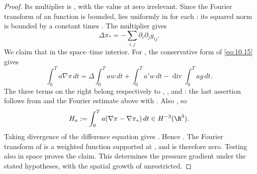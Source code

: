 \begin{proof}
%
Its multiplier is , with the value at zero
irrelevant. Since the Fourier transform of an  function is
bounded,  lies uniformly in
 for each : its squared
norm is bounded by a constant times
. The multiplier gives
\[
  \Delta\pi_*=-\sum_{i,j}\partial_i\partial_jg_{ij}.
\]
We claim that  in the space--time interior.
For , the conservative form of
\eqref{eq:10.15} gives
\[
  \int_0^T a\nabla\pi\,dt
  =\Delta\int_0^T aw\,dt+\int_0^T a'w\,dt
   -\operatorname{div}\int_0^T ag\,dt.
\]
The three terms on the right belong respectively to
, , and
: the last assertion follows from
 and the Fourier estimate above with
. Also
, so
\[
  H_a:=\int_0^T a(\nabla\pi-\nabla\pi_*)\,dt\in H^{-3}(\R^3).
\]
Taking divergence of the difference equation gives
.
Hence . The Fourier transform of
 is a weighted  function supported at
, and is therefore zero. Testing also in space proves the
claim. This determines the pressure gradient under the stated hypotheses, with the spatial
growth of  unrestricted.


\end{proof}

